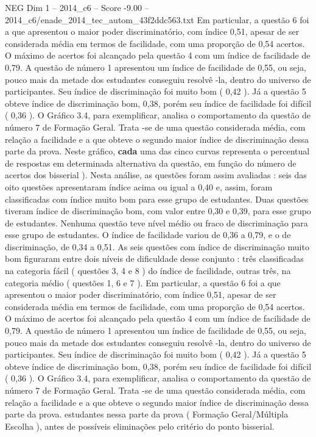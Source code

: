 \begin{textsample}{NEG Dim 1 – 2014\_c6 – Score -9.00 – 2014\_c6/enade\_2014\_tec\_autom\_43f2ddc563.txt}
Em particular, a questão 6 foi a que apresentou o maior poder discriminatório, com índice 0,51, apesar de ser considerada média em termos de facilidade, com uma proporção de 0,54 acertos.
O máximo de acertos foi alcançado pela questão 4 com um índice de facilidade de 0,79.
A questão de número 1 apresentou um índice de facilidade de 0,55, ou seja, pouco mais da metade dos estudantes conseguiu resolvê -la, dentro do universo de participantes.
Seu índice de discriminação foi muito bom ( 0,42 ).
Já a questão 5 obteve índice de discriminação bom, 0,38, porém seu índice de facilidade foi difícil ( 0,36 ).
O Gráfico 3.4, para exemplificar, analisa o comportamento da questão de número 7 de Formação Geral.
Trata -se de uma questão considerada média, com relação a facilidade e a que obteve o segundo maior índice de discriminação dessa parte da prova.
Neste gráfico, \textbf{cada} uma das cinco curvas representa o percentual de respostas em determinada alternativa da questão, em função do número de acertos dos bisserial ).
Nesta análise, as questões foram assim avaliadas : seis das oito questões apresentaram índice acima ou igual a 0,40 e, assim, foram classificadas com índice muito bom para esse grupo de estudantes.
Duas questões tiveram índice de discriminação bom, com valor entre 0,30 e 0,39, para esse grupo de estudantes.
Nenhuma questão teve nível médio ou fraco de discriminação para esse grupo de estudantes.
O índice de facilidade variou de 0,36 a 0,79, e o de discriminação, de 0,34 a 0,51.
As seis questões com índice de discriminação muito bom figuraram entre dois níveis de dificuldade desse conjunto : três classificadas na categoria fácil ( questões 3, 4 e 8 ) do índice de facilidade, outras três, na categoria médio ( questões 1, 6 e 7 ).
Em particular, a questão 6 foi a que apresentou o maior poder discriminatório, com índice 0,51, apesar de ser considerada média em termos de facilidade, com uma proporção de 0,54 acertos.
O máximo de acertos foi alcançado pela questão 4 com um índice de facilidade de 0,79.
A questão de número 1 apresentou um índice de facilidade de 0,55, ou seja, pouco mais da metade dos estudantes conseguiu resolvê -la, dentro do universo de participantes.
Seu índice de discriminação foi muito bom ( 0,42 ).
Já a questão 5 obteve índice de discriminação bom, 0,38, porém seu índice de facilidade foi difícil ( 0,36 ).
O Gráfico 3.4, para exemplificar, analisa o comportamento da questão de número 7 de Formação Geral.
Trata -se de uma questão considerada média, com relação a facilidade e a que obteve o segundo maior índice de discriminação dessa parte da prova. estudantes nessa parte da prova ( Formação Geral/Múltipla Escolha ), antes de possíveis eliminações pelo critério do ponto bisserial.

\end{textsample}
